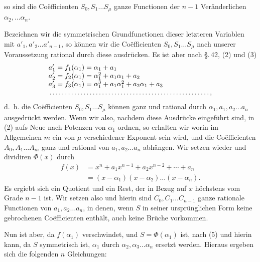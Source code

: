 so sind die Coëfficienten $S_0,S_1\ldots S_\mu$ ganze  Functionen der $n-1$ Veränderlichen $\alpha_2,\ldots\alpha_n$.

Bezeichnen wir die symmetrischen Grundfunctionen dieser letzteren Variablen mit $a'_1,a'_2\ldots a'_{n-1}$, so können wir die Coëfficienten $S_0,S_1\ldots S_\mu$ nach unserer Voraussetzung rational durch diese ausdrücken. Es ist aber nach \S.\,42, (2) und (3)
\[
\begin{array}{l}
 a'_1=f_1(\alpha_1)=\alpha_1+a_1\\
 a'_2=f_2(\alpha_1)=\alpha_1^2+a_1\alpha_1+a_2\\
 a'_3=f_3(\alpha_1)=\alpha_1^3+a_1\alpha_1^2+a_2\alpha_1+a_3\\
 \makebox[23em][l]{\dotfill},
\end{array}
\]
d.\ h. die Coëfficienten $S_0,S_1\ldots S_\mu$ können ganz und rational durch $\alpha_1,a_1,a_2\ldots a_n$ ausgedrückt werden. Wenn wir also, nachdem diese Ausdrücke eingeführt sind, in (2) aufs Neue nach Potenzen von $\alpha_1$ ordnen, so erhalten wir
worin im Allgemeinen $m$ ein von $\mu$ verschiedener Exponent sein wird, und die Coëfficienten $A_0,A_1\ldots A_m$ ganz und rational von $a_1,a_2\ldots a_n$ abhängen. Wir setzen wieder
und dividiren $\Phi(x)$ durch
\[
\begin{aligned}
 f(x)&=x^n+a_1x^{n-1}+a_2x^{n-2}+\cdots+a_n\\
     &=(x-\alpha_1)(x-\alpha_2)\ldots(x-\alpha_n).
\end{aligned}
\]
Es ergiebt sich ein Quotient und ein Rest, der in Bezug auf $x$ höchstens vom Grade $n-1$ ist. Wir setzen also
und hierin sind $C_0,C_1\ldots C_{n-1}$ ganze rationale Functionen von $a_1,a_2\ldots a_n$, in denen, wenn $S$ in seiner ursprünglichen Form keine gebrochenen Coëfficienten enthält, auch keine Brüche vorkommen.

Nun ist aber, da $f(\alpha_1)$ verschwindet, und $S=\Phi(\alpha_1)$ ist, nach (5)
und hierin kann, da $S$ symmetrisch ist, $\alpha_1$ durch $\alpha_2,\alpha_3\ldots\alpha_n$ ersetzt werden. Hieraus ergeben sich die folgenden $n$ Gleichungen:
